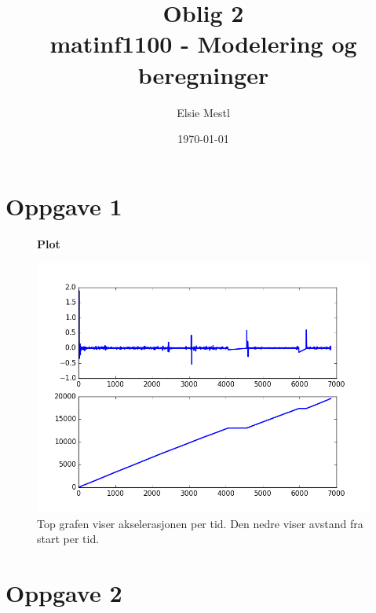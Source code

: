 \documentclass[a4paper, norsk, twoside, 10pt]{article}
\author{Elsie Mestl}
\date{\today}
\title{Oblig 2 \\ matinf1100 - Modelering og beregninger}
\begin{document}
\maketitle

\section*{Oppgave 1}


\begin{figure}[H]
  \centering
  \textbf{Plot}\par\medskip
  \caption{Top grafen viser akselerasjonen per tid. Den nedre viser avstand fra start per tid.}
  \includegraphics[width = \textwidth ]{opgv1.png}
\end{figure}

\section*{Oppgave 2}
\end{document}
